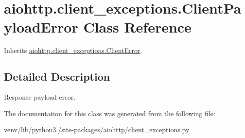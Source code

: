 \hypertarget{classaiohttp_1_1client__exceptions_1_1_client_payload_error}{}\section{aiohttp.\+client\+\_\+exceptions.\+Client\+Payload\+Error Class Reference}
\label{classaiohttp_1_1client__exceptions_1_1_client_payload_error}


Inherits \hyperlink{classaiohttp_1_1client__exceptions_1_1_client_error}{aiohttp.\+client\+\_\+exceptions.\+Client\+Error}.



\subsection{Detailed Description}
\begin{DoxyVerb}Response payload error.\end{DoxyVerb}
 

The documentation for this class was generated from the following file\+:\begin{DoxyCompactItemize}
\item 
venv/lib/python3./site-\/packages/aiohttp/client\+\_\+exceptions.\+py\end{DoxyCompactItemize}
